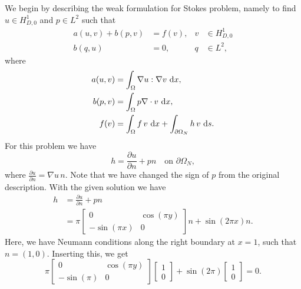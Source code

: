 \begin{solution}{6.6}\label{sol:6.6}
    We begin by describing the weak formulation for Stokes problem, namely to find $u \in H_{D,0}^{1}$ and $p \in L^{2}$ such that
    \begin{align*}
        a(u, v) + b(p, v) &= f(v), & v &\in H_{D,0}^{1} \\
        b(q, u) &= 0, & q &\in L^{2},
    \end{align*}
    where
    \begin{align*}
        a(u, v) &= \int_{\Omega} \nabla u : \nabla v \, \mathop{}\!\mathrm{d} x, \\
        b(p, v) &= \int_\Omega p \nabla \cdot v \, \mathop{}\!\mathrm{d} x, \\
        f(v) &= \int_{\Omega} f \, v \, \mathop{}\!\mathrm{d} x + \int_{\partial\Omega_N} h \, v \, \mathop{}\!\mathrm{d} s.
    \end{align*}
    For this problem we have
    \begin{equation*}
        h = \frac{\partial u}{\partial n} + p n \quad \text{on } \partial\Omega_N,
    \end{equation*}
    where $\frac{\partial u}{\partial n} = \nabla u \, n$.
    Note that we have changed the sign of $p$ from the original description.
    With the given solution we have
    \begin{align*}
        h &= \frac{\partial u}{\partial n} + p n \\
        &= \pi
        \begin{bmatrix}
            0 & \cos(\pi y) \\
            -\sin(\pi x) & 0
        \end{bmatrix} n + \sin(2 \pi x) n.
    \end{align*}
    Here, we have Neumann conditions along the right boundary at $x = 1$, such that $n = (1, 0)$.
    Inserting this, we get
    \begin{equation*}
        \pi
        \begin{bmatrix}
            0 & \cos(\pi y) \\
            -\sin(\pi) & 0
        \end{bmatrix}
        \begin{bmatrix}
            1 \\ 0
        \end{bmatrix} + \sin(2 \pi)
        \begin{bmatrix}
            1 \\ 0
        \end{bmatrix}
        = 0.
    \end{equation*}


\end{solution}
